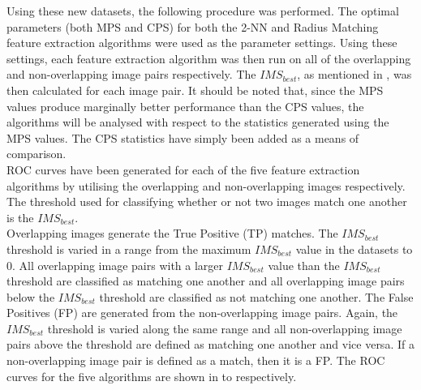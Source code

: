 \documentclass[11pt]{report}
\begin{document}
Using these new datasets, the following procedure was performed. The optimal parameters (both MPS and CPS) for both the 2-NN and Radius Matching feature extraction algorithms were used as the parameter settings. Using these settings, each feature extraction algorithm was then run on all of the overlapping and non-overlapping image pairs respectively. The $IMS_{best}$, as mentioned in , was then calculated for each image pair. It should be noted that, since the MPS values produce marginally better performance than the CPS values, the algorithms will be analysed with respect to the statistics generated using the MPS values. The CPS statistics have simply been added as a means of comparison. \\

ROC curves have been generated for each of the five feature extraction algorithms by utilising the overlapping and non-overlapping images respectively. The threshold used for classifying whether or not two images match one another is the $IMS_{best}$. \\

Overlapping images generate the True Positive (TP) matches. The $IMS_{best}$ threshold is varied in a range from the maximum $IMS_{best}$ value in the datasets to $0$.  All overlapping image pairs with a larger $IMS_{best}$ value than the $IMS_{best}$ threshold are classified as matching one another and all overlapping image pairs below the $IMS_{best}$ threshold are classified as not matching one another. The False Positives (FP) are generated from the non-overlapping image pairs. Again, the $IMS_{best}$ threshold is varied along the same range and all non-overlapping image pairs above the threshold are defined as matching one another and vice versa. If a non-overlapping image pair is defined as a match, then it is a FP. The ROC curves for the five algorithms are shown in  to  respectively.\\
\end{document}

